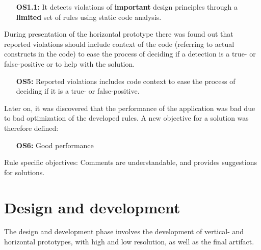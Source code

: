 \documentclass{report}
\begin{document}
\begin{itemize}
    \item [\textbf{OS1.1:}] It detects violations of \textbf{important} design principles through a \textbf{limited} set of rules using static code analysis.
\end{itemize}

During presentation of the horizontal prototype there was found out that reported violations should include context of the code (referring to actual constructs in the code) to ease the process of deciding if a detection is a true- or false-positive or to help with the solution. 

\begin{itemize}
        \item [\textbf{OS5:}] Reported violations includes code context to ease the process of deciding if it is a true- or false-positive. 
\end{itemize}

Later on, it was discovered that the performance of the application was bad due to bad optimization of the developed rules. A new objective for a solution was therefore defined:
\begin{itemize}
    \item [\textbf{OS6:}] Good performance
\end{itemize}






Rule specific objectives: 
Comments are understandable, and provides suggestions for solutions.

\section{Design and development}
\label{design-development}


The design and development phase involves the development of vertical- and horizontal prototypes, with high and low resolution, as well as the final artifact. 
\end{document}
